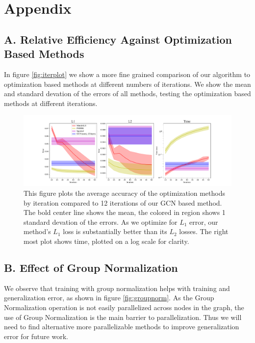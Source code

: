 \documentclass[10pt,twocolumn,letterpaper]{article}
\begin{document}
{\small


}

\newpage
\onecolumn

\section*{Appendix}

\subsection*{A. Relative Efficiency Against Optimization Based Methods}

In figure \ref{fig:iterplot} we show a more fine grained comparison of our algorithm to optimization based methods at different numbers of iterations.
We show the mean and standard devation of the errors of all methods, testing the optimization based methods at different iterations.


\begin{figure}[ht]
\begin{center}
  \includegraphics[width=0.9\linewidth]{figures-IterationsPlot.pdf}
\end{center}
  \caption{
    This figure plots the average accuracy of the optimization methods by iteration compared to 12 iterations of our GCN based method.
    The bold center line shows the mean, the colored in region shows 1 standard devation of the errors.
    As we optimize for $L_1$ error, our method's $L_1$ loss is substantially better than its $L_2$ losses.
    The right most plot shows time, plotted on a log scale for clarity.
  }
\label{fig:iterplot}
\label{fig:onecol}
\end{figure}

\subsection*{B. Effect of Group Normalization}
We observe that training with group normalization helps with training and generalization error, as shown in figure \ref{fig:groupnorm}.
As the Group Normalization operation is not easily parallelized across nodes in the graph, the use of Group Normalization is the main barrier to parallelization.
Thus we will need to find alternative more parallelizable methods to improve generalization error for future work.
\end{document}
